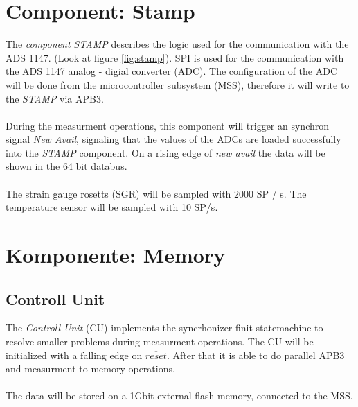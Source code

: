 \section{Component: Stamp}
\label{bes:Stamp}
The \textit{component STAMP} describes the logic used for the communication with the ADS 1147. (Look at figure \ref{fig:stamp}).  
SPI is used for the communication with the ADS 1147 analog - digial converter (ADC). The configuration of the ADC will be done from the microcontroller subsystem (MSS), therefore it will write to the \textit{STAMP} via APB3. \\ \\
During the measurment operations, this component will trigger an synchron signal \textit{New Avail}, signaling that the values of the ADCs are loaded successfully into the \textit{STAMP} component. On a rising edge of \textit{new avail} the data will be shown in the 64 bit databus. \\\\
The strain gauge rosetts (SGR) will be sampled with 2000 SP / s. The temperature sensor will be sampled with 10 SP/s. 
\section{Komponente: Memory}
\label{bes:memory}
\subsection{Controll Unit}
The \textit{Controll Unit} (CU) implements the syncrhonizer finit statemachine to resolve smaller problems during measurment operations. The CU will be initialized with a falling edge on $\overline{reset}$. After that it is able to do parallel APB3 and measurment to memory operations. \\ \\
The data will be stored on a 1Gbit external flash memory, connected to the MSS. 


